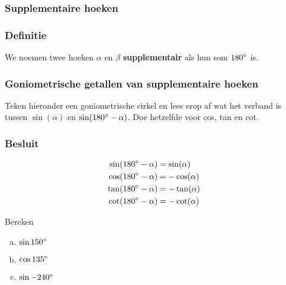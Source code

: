 \documentclass[a4paper,12pt]{article}
\begin{document}
\begin{theorie}

\pagebreak
\subsubsection{Supplementaire hoeken}

\subsubsection*{Definitie}
We noemen twee hoeken $\alpha$ en $\beta$ \textbf{supplementair} als hun som $180^\circ$ is.

\subsubsection*{Goniometrische getallen van supplementaire hoeken}
Teken hieronder een goniometrische cirkel en lees erop af wat het verband is tussen $\sin(\alpha)$ en $\sin(180^\circ-\alpha)$. Doe hetzelfde voor cos, tan en cot.
\vspace*{7cm}
\subsubsection*{Besluit}
\begin{align*}
  \sin(180^\circ-\alpha)&=\sin(\alpha)\\
  \cos(180^\circ-\alpha)&=-\cos(\alpha)\\
  \tan(180^\circ-\alpha)&=-\tan(\alpha)\\
  \cot(180^\circ-\alpha)&=-\cot(\alpha)
\end{align*}

\end{theorie}

\begin{oefening}
Bereken
\begin{multicols}{3}
\begin{enumerate}[(a)]
  \item $\sin150^\circ$
  \item $\cos135^\circ$
  \item $\sin-240^\circ$
\end{enumerate}
\end{multicols}
\end{oefening}
\end{document}
